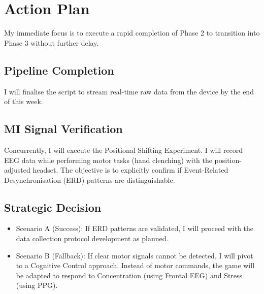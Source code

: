 \documentclass[a4paper, 11pt, openany]{report}
\begin{document}
\chapter{Action Plan}
    
    My immediate focus is to execute a rapid completion of Phase 2 to transition into Phase 3 without further delay.
    
    \section{Pipeline Completion}
    I will finalise the script to stream real-time raw data from the device by the end of this week.
    
    \section{MI Signal Verification}
    Concurrently, I will execute the Positional Shifting Experiment. I will record EEG data while performing motor tasks (hand clenching) with the position-adjusted headset. The objective is to explicitly confirm if Event-Related Desynchronisation (ERD) patterns are distinguishable.

    \section{Strategic Decision}
    \begin{itemize}
        \item Scenario A (Success): If ERD patterns are validated, I will proceed with the data collection protocol development as planned.
        \item Scenario B (Fallback): If clear motor signals cannot be detected, I will pivot to a Cognitive Control approach. Instead of motor commands, the game will be adapted to respond to Concentration (using Frontal EEG) and Stress (using PPG).
    \end{itemize}
\end{document}
